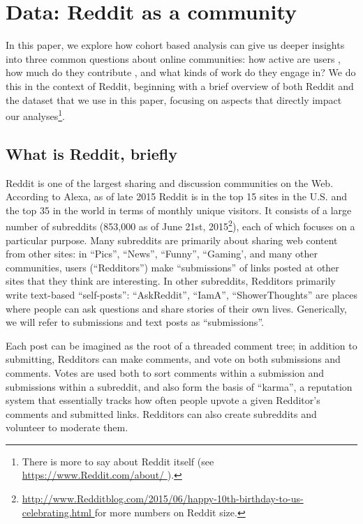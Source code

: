 \section{Data: Reddit as a community}

In this paper, we explore how cohort based analysis can give us deeper insights into three common questions about online communities: how active are users \cite{Scellato2011,Hughes2009,Java2007,Levy1984}, how much do they contribute \cite{Scellato2011,Gruhl2004,Guo2009}, and what kinds of work do they engage in?  We do this in the context of Reddit, beginning with a brief overview of both Reddit and the dataset that we use in this paper, focusing on aspects that directly impact our analyses\footnote{There is more to say about Reddit itself (see \url{https://www.Reddit.com/about/ }).}.


\subsection{What is Reddit, briefly}

Reddit is one of the largest sharing and discussion communities on the Web.  According to Alexa, as of late 2015 Reddit is in the top 15 sites in the U.S. and the top 35 in the world in terms of monthly unique visitors.  It consists of a large number of subreddits (853,000 as of June 21st, 2015\footnote{\url{http://www.Redditblog.com/2015/06/happy-10th-birthday-to-us-celebrating.html }for more numbers on Reddit size.}), each of which focuses on a particular purpose.  Many subreddits are primarily about sharing web content from other sites: in ``Pics'', ``News'', ``Funny'', ``Gaming', and many other communities, users (``Redditors'') make ``submissions'' of links posted at other sites that they think are interesting.  In other subreddits, Redditors primarily write text-based ``self-posts'': ``AskReddit'', ``IamA'', ``ShowerThoughts'' are places where people can ask questions and share stories of their own lives.  Generically, we will refer to submissions and text posts as ``submissions''.  

Each post can be imagined as the root of a threaded comment tree; in addition to submitting, Redditors can make comments, and vote on both submissions and comments.  Votes are used both to sort comments within a submission and submissions within a subreddit, and also form the basis of ``karma'', a reputation system that essentially tracks how often people upvote a given Redditor's comments and submitted links.  Redditors can also create subreddits and volunteer to moderate them.

